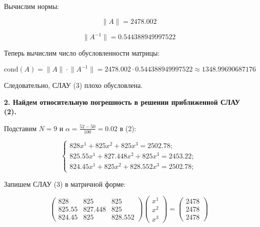 \documentclass[a4paper, 12pt]{extarticle}
\begin{document}

Вычислим нормы:

\begin{equation}
    \lVert A \rVert = 2478.002 
\end{equation}

\begin{equation}
    \lVert A^{-1} \rVert = 0.544388949997522
\end{equation}

Теперь вычислим число обусловленности матрицы:

\begin{equation}
    \textrm{cond}(A) = \lVert A \rVert \cdot \lVert A^{-1} \rVert = 2478.002 \cdot 0.544388949997522 \approx 1348.99690687176
\end{equation}

Следовательно, СЛАУ (3) плохо обусловлена.

\textbf{2. Найдем относительную погрешность в решении приближенной СЛАУ (2).}

Подставим $N = 9$ и $\alpha = \frac{52 - 50}{100} = 0.02$ в (2):

\begin{equation}
    \begin{cases}
        828x^1 + 825x^2 + 825x^3 = 2502.78;\\
        825.55x^1 + 827.448x^2 + 825x^3 = 2453.22;\\
        824.45x^1 + 825x^2 + 828.552x^3 = 2502.78;
    \end{cases}
\end{equation}

Запишем СЛАУ (3) в матричной форме:

\begin{equation}
    \begin{pmatrix}
        828    & 825     & 825 \\ 
        825.55 & 827.448 & 825 \\ 
        824.45 & 825     & 828.552 
    \end{pmatrix}
    \begin{pmatrix}
        x^1 \\ 
        x^2 \\ 
        x^3 
    \end{pmatrix}
    =
    \begin{pmatrix}
        2478 \\ 
        2478 \\ 
        2478 
    \end{pmatrix}
\end{equation}
\end{document}
